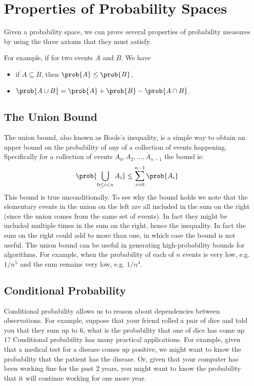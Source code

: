 \section{Properties of Probability Spaces}
\label{sec:probability::spaces::spaces-properties}

\begin{gram}
Given a probability space, we can prove several properties of
probability measures by using the three axioms that they must satisfy.

For example, if for two events $A$ and $B$.  We have
\begin{itemize}
\item if $A \subseteq B$, then  $\prob{A} \le \prob{B}$,
\item $\prob{A \cup B} = \prob{A}  + \prob{B} -  \prob{A \cap B}$.
\end{itemize}
\end{gram}

\subsection{The Union Bound}
\label{sec:probability::spaces::union-bound}
\begin{gram}
The union bound, also known as Boole's inequality, is a simple way to
obtain an upper bound on the probability of any of a collection of events
happening.  Specifically for a collection of events
$A_0, A_2, \ldots, A_{n-1}$ the bound is:
\[
\prob{\bigcup_{0 \leq i < n} A_i} \leq \sum_{i=0}^{n-1} \prob{A_i} 
\]
This bound is true unconditionally.
%
To see why the bound holds we note that the elementary events
in the union on the left are all included in the sum on the right
(since the union comes from the same set of events).  
%
In fact they
might be included multiple times in the sum on the right, hence the
inequality.  In fact the sum on the right could add to more than one, in
which case the bound is not useful.  
%
The union bound can be useful in generating high-probability bounds
for algorithms. For example, when the probability of each of $n$
events is very low, e.g. $1/n^5$ and the sum remains very low,
e.g. $1/n^4$.
\end{gram}

\subsection{Conditional Probability}
\label{sec:probability::spaces::conditional-pr}
\begin{gram}

Conditional probability allows us to reason about dependencies between
observations.  
%
For example, suppose that  your friend rolled a pair of dice and told
you that they sum up to $6$, what is the probability that one of
dice has come up $1$?  
%
Conditional probability has many practical applications.
%
For example, given that a medical test for a disease comes up
positive, we might want to know  the probability that the patient has the disease. 
%
Or, given that your computer has been working fine for the past 2
years, you might want to know the probability that it will continue
working for one more year.
\end{gram}

